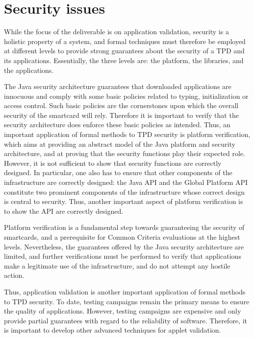\section{Security issues}
While the focus of the deliverable is on application validation,
security is a holistic property of a system, and formal techniques
must therefore be employed at different levels to provide strong
guarantees about the security of a TPD and its applications.
Essentially, the three levels are: the platform, the libraries,
and the applications.

The Java security architecture guarantees that downloaded
applications are innocuous and comply with some basic policies related
to typing, initialization or access control. Such basic policies are
the cornerstones upon which the overall security of the smartcard will
rely. Therefore it is important to verify that the security
architecture does enforce these basic policies as intended. Thus, an
important application of formal methods to TPD security is
platform verification, which aims at providing an abstract model of
the Java platform and security architecture, and at proving that
the security functions play their expected role.  However, it is not
sufficient to show that security functions are correctly designed. In
particular, one also has to ensure that other components of the
infrastructure are correctly designed: the Java API and the
Global Platform API constitute two prominent components of the
infrastructure whose correct design is central to security. Thus,
another important aspect of platform verification is to show the API
are correctly designed.

Platform verification is a fundamental step towards guaranteeing the
security of smartcards, and a prerequisite for Common Criteria
evaluations at the highest levels. Nevertheless, the guarantees
offered by the Java security architecture are limited, and
further verifications must be performed to verify that applications
make a legitimate use of the infrastructure, and do not attempt any
hostile action. 

Thus, application validation is another important application of
formal methods to TPD security. To date, testing campaigns remain the
primary means to ensure the quality of applications. However, testing
campaigns are expensive and only provide partial guarantees with
regard to the reliability of software. Therefore, it is important to
develop other advanced techniques for applet validation.

